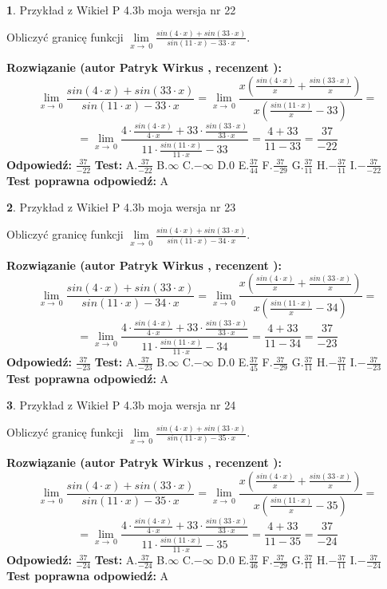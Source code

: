 \documentclass[12pt, a4paper]{article}
\theoremstyle{definition} %
\newtheorem{zad}{}
\newcommand{\zadStart}[1]{\begin{zad}#1\newline}
\newcommand{\zadStop}{\end{zad}}
\newcommand{\rozwStart}[2]{\noindent \textbf{Rozwiązanie (autor #1 , recenzent #2): }\newline}
\newcommand{\rozwStop}{\newline}
\newcommand{\odpStart}{\noindent \textbf{Odpowiedź:}\newline}
\newcommand{\odpStop}{\newline}
\newcommand{\testStart}{\noindent \textbf{Test:}\newline}
\newcommand{\testStop}{\newline}
\newcommand{\kluczStart}{\noindent \textbf{Test poprawna odpowiedź:}\newline}
\newcommand{\kluczStop}{\newline}
\begin{document}
\zadStart{Przykład z Wikieł P 4.3b moja wersja nr 22}


Obliczyć granicę funkcji $\lim\limits_{x\to\ 0}\frac{sin(4 \cdot x)+sin(33 \cdot x)}{sin(11 \cdot x)-33 \cdot x}$.
\zadStop
\rozwStart{Patryk Wirkus}{}
$$\lim\limits_{x\to\ 0}\frac{sin(4 \cdot x)+sin(33 \cdot x)}{sin(11 \cdot x)-33 \cdot x}=\lim\limits_{x\to\ 0}\frac{x(\frac{sin(4 \cdot x)}{x}+\frac{sin(33 \cdot x)}{x})}{x(\frac{sin(11 \cdot x)}{x}-33)}=$$
$$=\lim\limits_{x\to\ 0}\frac{4 \cdot \frac{sin(4 \cdot x)}{4 \cdot x}+33 \cdot \frac{sin(33 \cdot x)}{33 \cdot x}}{11 \cdot \frac{sin(11 \cdot x)}{11 \cdot x}-33}=\frac{4+33}{11-33} = \frac{37}{-22}$$
\rozwStop
\odpStart
$\frac{37}{-22}$
\odpStop
\testStart
A.$\frac{37}{-22}$
B.$\infty$
C.$-\infty$
D.$0$
E.$\frac{37}{44}$
F.$\frac{37}{-29}$
G.$\frac{37}{11}$
H.$-\frac{37}{11}$
I.$-\frac{37}{-22}$
\testStop
\kluczStart
A
\kluczStop



\zadStart{Przykład z Wikieł P 4.3b moja wersja nr 23}


Obliczyć granicę funkcji $\lim\limits_{x\to\ 0}\frac{sin(4 \cdot x)+sin(33 \cdot x)}{sin(11 \cdot x)-34 \cdot x}$.
\zadStop
\rozwStart{Patryk Wirkus}{}
$$\lim\limits_{x\to\ 0}\frac{sin(4 \cdot x)+sin(33 \cdot x)}{sin(11 \cdot x)-34 \cdot x}=\lim\limits_{x\to\ 0}\frac{x(\frac{sin(4 \cdot x)}{x}+\frac{sin(33 \cdot x)}{x})}{x(\frac{sin(11 \cdot x)}{x}-34)}=$$
$$=\lim\limits_{x\to\ 0}\frac{4 \cdot \frac{sin(4 \cdot x)}{4 \cdot x}+33 \cdot \frac{sin(33 \cdot x)}{33 \cdot x}}{11 \cdot \frac{sin(11 \cdot x)}{11 \cdot x}-34}=\frac{4+33}{11-34} = \frac{37}{-23}$$
\rozwStop
\odpStart
$\frac{37}{-23}$
\odpStop
\testStart
A.$\frac{37}{-23}$
B.$\infty$
C.$-\infty$
D.$0$
E.$\frac{37}{45}$
F.$\frac{37}{-29}$
G.$\frac{37}{11}$
H.$-\frac{37}{11}$
I.$-\frac{37}{-23}$
\testStop
\kluczStart
A
\kluczStop



\zadStart{Przykład z Wikieł P 4.3b moja wersja nr 24}


Obliczyć granicę funkcji $\lim\limits_{x\to\ 0}\frac{sin(4 \cdot x)+sin(33 \cdot x)}{sin(11 \cdot x)-35 \cdot x}$.
\zadStop
\rozwStart{Patryk Wirkus}{}
$$\lim\limits_{x\to\ 0}\frac{sin(4 \cdot x)+sin(33 \cdot x)}{sin(11 \cdot x)-35 \cdot x}=\lim\limits_{x\to\ 0}\frac{x(\frac{sin(4 \cdot x)}{x}+\frac{sin(33 \cdot x)}{x})}{x(\frac{sin(11 \cdot x)}{x}-35)}=$$
$$=\lim\limits_{x\to\ 0}\frac{4 \cdot \frac{sin(4 \cdot x)}{4 \cdot x}+33 \cdot \frac{sin(33 \cdot x)}{33 \cdot x}}{11 \cdot \frac{sin(11 \cdot x)}{11 \cdot x}-35}=\frac{4+33}{11-35} = \frac{37}{-24}$$
\rozwStop
\odpStart
$\frac{37}{-24}$
\odpStop
\testStart
A.$\frac{37}{-24}$
B.$\infty$
C.$-\infty$
D.$0$
E.$\frac{37}{46}$
F.$\frac{37}{-29}$
G.$\frac{37}{11}$
H.$-\frac{37}{11}$
I.$-\frac{37}{-24}$
\testStop
\kluczStart
A
\kluczStop
\end{document}
